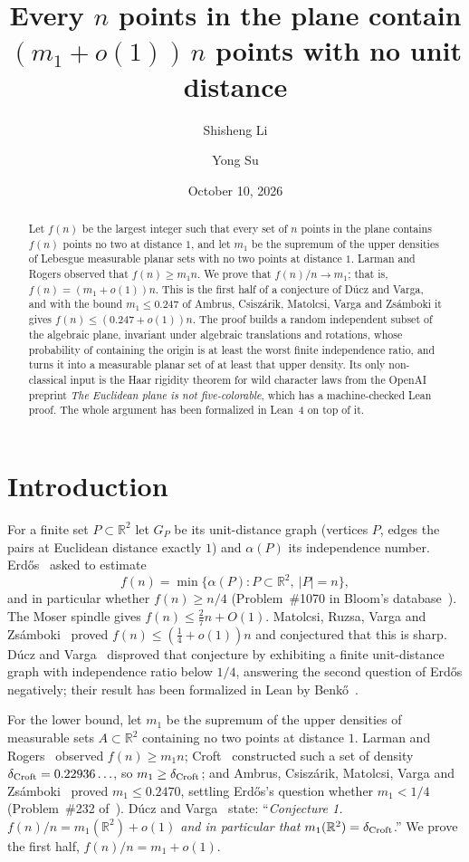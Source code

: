 \documentclass[11pt]{amsart}
\title[Unit-distance-free subsets of finite planar sets]{Every $n$ points in the plane contain $(m_1+o(1))\,n$ points with no unit distance}
\author{Shisheng Li}
\author{Yong Su}
\date{October 10, 2026}
\theoremstyle{definition}
\theoremstyle{remark}
\newcommand{\R}{\mathbb{R}}
\begin{document}
\sloppy
\begin{abstract}
Let $f(n)$ be the largest integer such that every set of $n$ points in the plane contains $f(n)$ points no two at distance $1$, and let $m_1$ be the supremum of the upper densities of Lebesgue measurable planar sets with no two points at distance $1$. Larman and Rogers observed that $f(n)\ge m_1 n$. We prove that $f(n)/n\to m_1$; that is, $f(n)=(m_1+o(1))n$. This is the first half of a conjecture of D\'ucz and Varga, and with the bound $m_1\le 0.247$ of Ambrus, Csisz\'arik, Matolcsi, Varga and Zs\'amboki it gives $f(n)\le(0.247+o(1))n$. The proof builds a random independent subset of the algebraic plane, invariant under algebraic translations and rotations, whose probability of containing the origin is at least the worst finite independence ratio, and turns it into a measurable planar set of at least that upper density. Its only non-classical input is the Haar rigidity theorem for wild character laws from the OpenAI preprint \emph{The Euclidean plane is not five-colorable}, which has a machine-checked Lean proof. The whole argument has been formalized in Lean~4 on top of it.
\end{abstract}

\maketitle

\section{Introduction}

For a finite set $P\subset\R^2$ let $G_P$ be its unit-distance graph (vertices $P$, edges the pairs at Euclidean distance exactly $1$) and $\alpha(P)$ its independence number. Erd\H{o}s~\cite{Er87} asked to estimate
\[
  f(n)=\min\{\alpha(P):P\subset\R^2,\ |P|=n\},
\]
and in particular whether $f(n)\ge n/4$ (Problem~\#1070 in Bloom's database~\cite{EP}). The Moser spindle gives $f(n)\le\frac27n+O(1)$. Matolcsi, Ruzsa, Varga and Zs\'amboki~\cite{MRVZ} proved $f(n)\le(\frac14+o(1))n$ and conjectured that this is sharp. D\'ucz and Varga~\cite{DV} disproved that conjecture by exhibiting a finite unit-distance graph with independence ratio below $1/4$, answering the second question of Erd\H{o}s negatively; their result has been formalized in Lean by Benk\H{o}~\cite{Benko}.

For the lower bound, let $m_1$ be the supremum of the upper densities of measurable sets $A\subset\R^2$ containing no two points at distance $1$. Larman and Rogers~\cite{LR} observed $f(n)\ge m_1n$; Croft~\cite{Croft} constructed such a set of density $\delta_{\rm Croft}=0.22936\ldots$, so $m_1\ge\delta_{\rm Croft}$; and Ambrus, Csisz\'arik, Matolcsi, Varga and Zs\'amboki~\cite{ACMVZ} proved $m_1\le0.2470$, settling Erd\H{o}s's question whether $m_1<1/4$ (Problem~\#232 of~\cite{EP}). D\'ucz and Varga~\cite[\S2.1]{DV} state: ``\emph{Conjecture 1. $f(n)/n=m_1(\R^2)+o(1)$ and in particular that $m_1(\R^2)=\delta_{\rm Croft}$}.'' We prove the first half, $f(n)/n=m_1+o(1)$.
\end{document}
